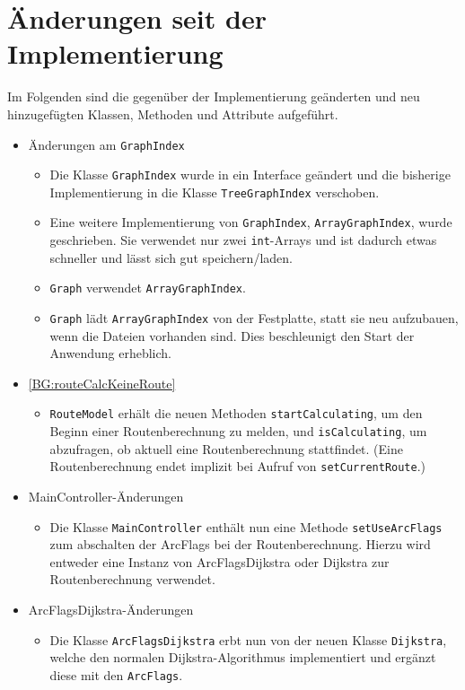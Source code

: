 \documentclass[a4paper, 11pt]{article}
\newcommand{\code}[1]{\texttt{#1}}
\begin{document}
\section{Änderungen seit der Implementierung}
Im Folgenden sind die gegenüber der Implementierung geänderten und neu hinzugefügten Klassen, Methoden und Attribute aufgeführt.

\begin{itemize}
\item Änderungen am \code{GraphIndex}
  \begin{itemize}
  \item Die Klasse \code{GraphIndex} wurde in ein Interface geändert und die bisherige Implementierung in die Klasse \code{TreeGraphIndex} verschoben.
  \item Eine weitere Implementierung von \code{GraphIndex}, \code{ArrayGraphIndex}, wurde geschrieben.
  Sie verwendet nur zwei \code{int}-Arrays und ist dadurch etwas schneller und lässt sich gut speichern/laden.
  \item \code{Graph} verwendet \code{ArrayGraphIndex}.
  \item \code{Graph} lädt \code{ArrayGraphIndex} von der Festplatte, statt sie neu aufzubauen, wenn die Dateien vorhanden sind. Dies beschleunigt den Start der Anwendung erheblich.
  \end{itemize}
\item\label{change:routeCalcKeineRoute} \ref{BG:routeCalcKeineRoute}
  \begin{itemize}
  \item \code{RouteModel} erhält die neuen Methoden \code{startCalculating}, um den Beginn einer Routenberechnung zu melden, und \code{isCalculating}, um abzufragen, ob aktuell eine Routenberechnung stattfindet.
  (Eine Routenberechnung endet implizit bei Aufruf von \code{setCurrentRoute}.)
  \end{itemize}
  \item MainController-Änderungen
    \begin{itemize}
    \item Die Klasse \code{MainController} enthält nun eine Methode \code{setUseArcFlags} zum abschalten der ArcFlags bei der Routenberechnung. Hierzu wird entweder eine Instanz von ArcFlagsDijkstra oder Dijkstra zur Routenberechnung verwendet.
    \end{itemize}
  \item ArcFlagsDijkstra-Änderungen
    \begin{itemize}
    \item Die Klasse \code{ArcFlagsDijkstra} erbt nun von der neuen Klasse \code{Dijkstra}, welche den normalen Dijkstra-Algorithmus implementiert und ergänzt diese mit den \code{ArcFlags}.
    \end{itemize}
\end{itemize}

\makeatletter
{}
\makeatother
\printglossary[type=main, title={Glossar}, toctitle={Glossar}, style=myAltlist]
\end{document}
